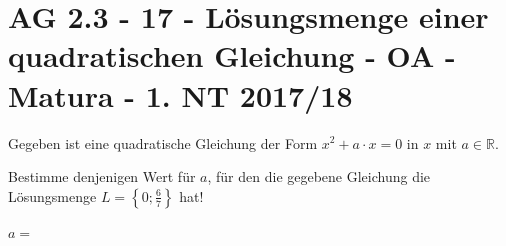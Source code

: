 \section{AG 2.3 - 17 - Lösungsmenge einer quadratischen Gleichung - OA - Matura - 1. NT 2017/18}

\begin{beispiel}[AG 2.3]{1}
Gegeben ist eine quadratische Gleichung der Form $x^2+a\cdot x=0$ in $x$ mit $a\in\mathbb{R}$.

Bestimme denjenigen Wert für $a$, für den die gegebene Gleichung die Lösungsmenge $L=\left\{0;\frac{6}{7}\right\}$ hat!\leer

$a=$\,
\end{beispiel}